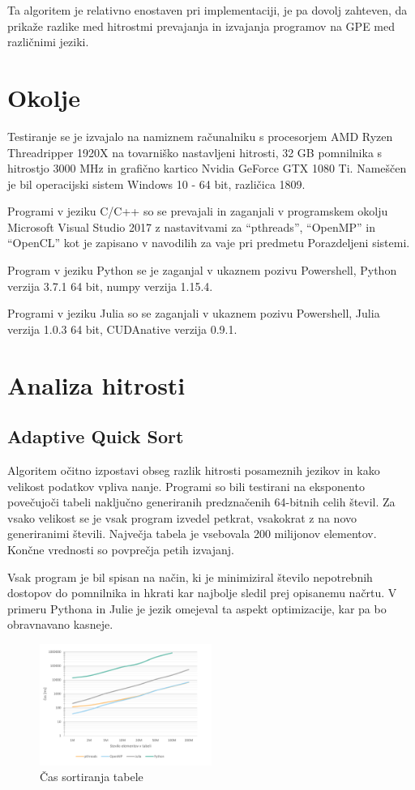 \documentclass[journal,a4paper,twoside]{sty/IEEEtran}
\begin{document}
Ta algoritem je relativno enostaven pri implementaciji, je pa dovolj zahteven, da prikaže razlike med hitrostmi prevajanja in izvajanja programov na GPE
	med različnimi jeziki.

\section{Okolje}

Testiranje se je izvajalo na namiznem računalniku s procesorjem AMD Ryzen Threadripper 1920X na tovarniško nastavljeni hitrosti, 32 GB pomnilnika s hitrostjo
	3000 MHz in grafično kartico Nvidia GeForce GTX 1080 Ti.
Nameščen je bil operacijski sistem Windows 10 - 64 bit, različica 1809.

Programi v jeziku C/C++ so se prevajali in zaganjali v programskem okolju Microsoft Visual Studio 2017 z nastavitvami za “pthreads”, “OpenMP” in “OpenCL”
	kot je zapisano v navodilih za vaje pri predmetu Porazdeljeni sistemi.

Program v jeziku Python se je zaganjal v ukaznem pozivu Powershell, Python verzija 3.7.1 64 bit, numpy verzija 1.15.4.

Programi v jeziku Julia so se zaganjali v ukaznem pozivu Powershell, Julia verzija 1.0.3 64 bit, CUDAnative verzija 0.9.1.

\section{Analiza hitrosti}

\subsection{Adaptive Quick Sort}

Algoritem očitno izpostavi obseg razlik hitrosti posameznih jezikov in kako velikost podatkov vpliva nanje.
Programi so bili testirani na eksponento povečujoči tabeli naključno generiranih predznačenih 64-bitnih celih števil.
Za vsako velikost se je vsak program izvedel petkrat, vsakokrat z na novo generiranimi števili.
Največja tabela je vsebovala 200 milijonov elementov.
Končne vrednosti so povprečja petih izvajanj.

Vsak program je bil spisan na način, ki je minimiziral število nepotrebnih dostopov do pomnilnika in hkrati kar najbolje sledil prej opisanemu načrtu.
V primeru Pythona in Julie je jezik omejeval ta aspekt optimizacije, kar pa bo obravnavano kasneje.

\begin{figure}[h]
\includegraphics[width=0.5\textwidth]{aqs_speed}
\caption{Čas sortiranja tabele}
\end{figure}
\end{document}
